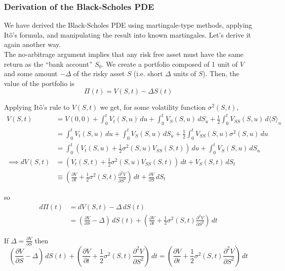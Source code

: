 \documentclass[12pt]{article}
\newlength\tindent
\renewcommand{\indent}{\hspace*{\tindent}}
\begin{document}
\subsubsection{Derivation of the Black-Scholes PDE}

\indent We have derived the Black-Scholes PDE using martingale-type methods, applying It\^{o}'s formula, and manipulating the result into known martingales. Let's derive it again another way. \\

\indent The no-arbitrage argument implies that any risk free asset must have the same return as the ``bank account'' $S_0$. We create a portfolio composed of 1 unit of $V$ and some amount $-\Delta$ of the risky asset $S$ (i.e. short $\Delta$ units of $S$). Then, the value of the portfolio is
\begin{equation*}
	\Pi(t) = V(S, t) - \Delta S(t)
\end{equation*}

Applying It\^{o}'s rule to $V(S, t)$ we get, for some volatility function $\sigma^2(S, t)$,
\begin{align*}
	V(S, t) &= V(0, 0) + \int^t_0 V_t(S, u) \,du + \int^t_0 V_{S}(S, u)\,dS_u + \frac{1}{2}\int^t_0 V_{SS}(S,u) \,d\langle S \rangle_u \\
	&= \int^t_0 V_t(S, u) \,du + \int^t_0 V_{S}(S, u)\,dS_u + \frac{1}{2}\int^t_0 V_{SS}(S,u) \sigma^2(S, u) \,du \\
	&= \int^t_0 \left( V_t(S, u) + \frac{1}{2}\sigma^2(S, u) V_{SS}(S, t) \right) \,du + \int^t_0 V_S(S, u)\,dS_u \\
	\implies dV(S, t) &= \left( V_t(S, t) + \frac{1}{2}\sigma^2(S, u) V_{SS}(S, t) \right)\,dt + V_S(S, t)\,dS_t \\ 
	&\equiv \left( \frac{\partial V}{\partial t} + \frac{1}{2}\sigma^2(S, t) \frac{\partial^2 V}{\partial S^2} \right) \,dt + \frac{ \partial V}{\partial S} \,dS_t
\end{align*}

so
\begin{align*}
	d\Pi(t) &= dV(S, t) - \Delta\,dS(t) \\
	&= \left( \frac{ \partial V }{ \partial S } - \Delta \right)\,dS(t) + \left( \frac{ \partial V }{ \partial t } + \frac{1}{2}\sigma^2(S,t)\frac{ \partial^2 V }{ \partial S^2 } \right)\,dt
\end{align*}

If $\Delta = \frac{ \partial V }{ \partial S }$ then 
\begin{equation*}
	\left( \frac{ \partial V }{ \partial S } - \Delta \right)\,dS(t) + \left( \frac{ \partial V }{ \partial t } + \frac{1}{2}\sigma^2(S,t)\frac{ \partial^2 V }{ \partial S^2 } \right)\,dt = \left( \frac{ \partial V }{ \partial t } + \frac{1}{2}\sigma^2(S,t)\frac{ \partial^2 V }{ \partial S^2 } \right)\,dt
\end{equation*}
\end{document}
